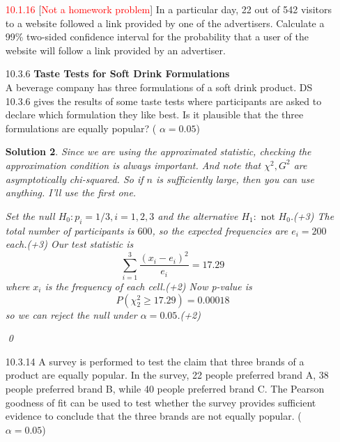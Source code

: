 \documentclass[a4paper,10pt]{article}
\newtheorem*{sol}{Solution}
\begin{document}
\begin{itemize}
\begin{sol}
	$(n, m, x, y) = (542, 601, 22, 64)$.
	Set the null $H_0: p_A \ge p_B$ and the alternative $H_1: p_A < p_B$.(+3)
	Use test statistic $z$ used in the above.
	Then observed test statistic is $-4.22$.
	So, p-value is pretty smaller than 0.05 since p-value is $P(Z \le -4.22)$, and $-4.22 < -1.64$.
	Thus we can reject the null, so there is evidence of the claim.(+7)
	
	\qed
\end{sol}
\item [\textcolor{red}{10.1.16}] [\textcolor{red}{Not a homework problem}]
In a particular day, 22 out of 542 visitors to a website
followed a link provided by one of the advertisers.
Calculate a 99\% two-sided confidence interval for the
probability that a user of the website will follow a link
provided by an advertiser.

\item [10.3.6]\textbf{Taste Tests for Soft Drink Formulations}\\
A beverage company has three formulations of a soft
drink product. DS 10.3.6 gives the results of some taste
tests where participants are asked to declare which
formulation they like best. Is it plausible that the three
formulations are equally popular? ( $\alpha=0.05$)

\begin{sol}
	Since we are using the approximated statistic, checking the approximation condition is always important.
	And note that $\chi^2, G^2$ are asymptotically chi-squared.
	So if $n$ is sufficiently large, then you can use anything.
	I'll use the first one.

	Set the null $H_0: p_i = 1/3, i= 1,2,3$ and the alternative $H_1:\text{ not }H_0$.(+3)
	The total number of participants is $600$, so the expected frequencies are $e_i = 200$ each.(+3)
	Our test statistic is
	\[
		\sum_{i=1}^3\frac{(x_i - e_i)^2}{e_i} = 17.29
	\]
	where $x_i$ is the frequency of each cell.(+2)
	Now p-value is
	\[
		P(\chi^2_2 \ge 17.29) = 0.00018
	\]
	so we can reject the null under $\alpha = 0.05$.(+2)

	\qed
\end{sol}
\item [10.3.14] A survey is performed to test the claim that three brands
of a product are equally popular. In the survey, 22 people
preferred brand A, 38 people preferred brand B, while
40 people preferred brand C. The Pearson goodness
of fit can be used to test whether the survey provides
sufficient evidence to conclude that the three brands are
not equally popular. ( $\alpha=0.05$)


\end{itemize}
\end{document}
